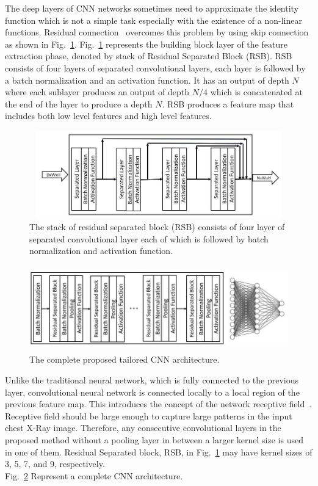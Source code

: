 The deep layers of CNN networks sometimes need to  approximate the identity function which is not a simple task especially  with the existence of a non-linear functions. Residual connection~\cite{he2016deep} overcomes this problem by using skip connection as shown in Fig.~\ref{fig4}.
Fig.~\ref{fig4} represents the building block layer of the feature extraction phase, denoted by stack of Residual Separated Block  (RSB). RSB consists of four layers of separated convolutional layers, each layer is followed by a batch normalization and an activation function. It has an output of depth $N$ where each sublayer produces an output of depth $N/4$ which is concatenated at the end of the layer to produce a depth  $N$. RSB produces a feature map that includes both low level features and high level features.

\begin{figure}
\begin{center}
\includegraphics[height=38mm,width=14.0cm]{Figures/fig4.jpg}
\caption{The stack of residual separated block  (RSB) consists of four layer of separated convolutional layer each of which is followed by batch normalization and activation function.}
\label{fig4}
\end{center}
\end{figure}

\begin{figure}
    \begin{center}
    \includegraphics[height=37mm,width=14.0cm]{Figures/fig5.jpg}
    \caption{The complete proposed tailored CNN architecture.}
    \label{fig5}
    \end{center}
    \end{figure}
    
Unlike the traditional neural network, which is fully connected to the previous layer, convolutional neural network is connected locally to a local region of the previous feature map. This introduces the concept of the network receptive field~\cite{luo2016understanding}. Receptive field should be large enough to capture large patterns in the input chest X-Ray image. Therefore, any consecutive convolutional layers in the proposed method without a pooling layer in between a larger kernel size is used in one of them. Residual Separated block, RSB, in Fig.~\ref{fig4} may have kernel sizes of 3, 5, 7, and 9, respectively.\\
Fig.~\ref{fig5} Represent a complete CNN architecture.

